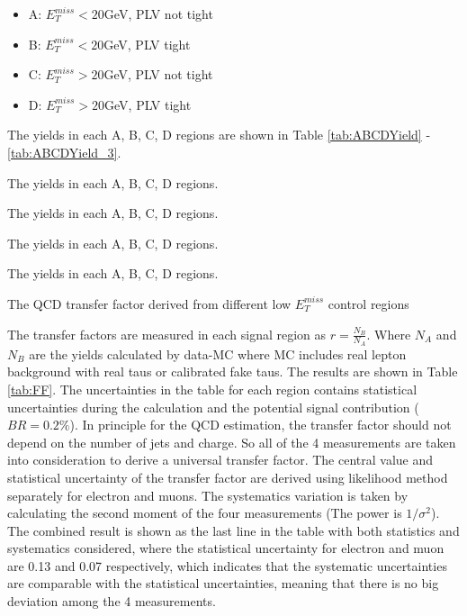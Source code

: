 \begin{itemize}
	\item A: $E_T^{miss}<20$GeV, PLV not tight
	\item B: $E_T^{miss}<20$GeV, PLV tight
	\item C: $E_T^{miss}>20$GeV, PLV not tight
	\item D: $E_T^{miss}>20$GeV, PLV tight
\end{itemize}

The yields in each A, B, C, D regions are shown in Table \ref{tab:ABCDYield} - \ref{tab:ABCDYield_3}.

\begin{table}
\caption{The yields in each A, B, C, D regions.}
\label{tab:ABCDYield}

\end{table}

\begin{table}
\caption{The yields in each A, B, C, D regions.}
\label{tab:ABCDYield_1}

\end{table}

\begin{table}
\caption{The yields in each A, B, C, D regions.}
\label{tab:ABCDYield_2}

\end{table}

\begin{table}
\caption{The yields in each A, B, C, D regions.}
\label{tab:ABCDYield_3}

\end{table}

\begin{table}
\caption{The QCD transfer factor derived from different low $E_T^{miss}$ control regions}
\label{tab:FF}

\end{table}

The transfer factors are measured in each signal region as $r=\frac{N_B}{N_A}$. Where $N_A$ and $N_B$ are the yields calculated by data-MC where MC includes real lepton background with real taus or calibrated fake taus. The results are shown in Table \ref{tab:FF}. The uncertainties in the table for each region contains statistical uncertainties during the calculation and the potential signal contribution ($BR=0.2\%$). In principle for the QCD estimation, the transfer factor should not depend on the number of jets and charge. So all of the 4 measurements are taken into consideration to derive a universal transfer factor. The central value and statistical uncertainty of the transfer factor are derived using likelihood method separately for electron and muons. The systematics variation is taken by calculating the second moment of the four measurements (The power is $1/\sigma^2$). The combined result is shown as the last line in the table with both statistics and systematics considered, where the statistical uncertainty for electron and muon are 0.13 and 0.07 respectively, which indicates that the systematic uncertainties are comparable with the statistical uncertainties, meaning that there is no big deviation among the 4 measurements.



